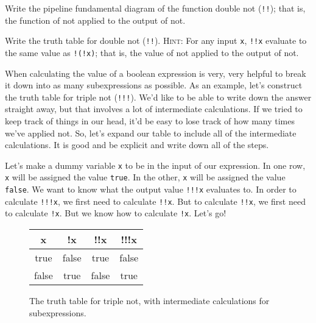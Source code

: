 \begin{question}
  Write the pipeline fundamental diagram of the function double \textsf{not} (\texttt{!!}); that is, the function of \textsf{not} applied to the output of \textsf{not}.
\end{question}

\begin{question}
  Write the truth table for double \textsf{not} (\texttt{!!}). \textsc{Hint:} For any input \texttt{x}, \texttt{!!x} evaluate to the same value as \texttt{!(!x)}; that is, the value of \textsf{not} applied to the output of \textsf{not}.
\end{question}

When calculating the value of a boolean expression is very, very helpful to break it down into as many subexpressions as possible. As an example, let's construct the truth table for triple \textsf{not} (\texttt{!!!}). We'd like to be able to write down the answer straight away, but that involves a lot of intermediate calculations. If we tried to keep track of things in our head, it'd be easy to lose track of how many times we've applied \textsf{not}. So, let's expand our table to include all of the intermediate calculations.  It is good and be explicit and write down all of the steps.

Let's make a dummy variable \texttt{x} to be in the input of our expression. In one row, \texttt{x} will be assigned the value \texttt{true}. In the other, \texttt{x} will be assigned the value \texttt{false}. We want to know what the output value \texttt{!!!x} evaluates to. In order to calculate \texttt{!!!x}, we first need to calculate \texttt{!!x}. But to calculate \texttt{!!x}, we first need to calculate \texttt{!x}. But we know how to calculate \texttt{!x}. Let's go!

\begin{figure}[h]
  \ttfamily
  \color{cyan}
  \small
  \begin{tabular}{c c c c}
    x & !x & !!x & !!!x \\
    \hline
    true & false & true & false\\
    false & true & false & true
  \end{tabular}
  \caption{\label{fig:conditional-triple-not-table}The truth table for triple \textsf{not}, with intermediate calculations for subexpressions.}
\end{figure}

